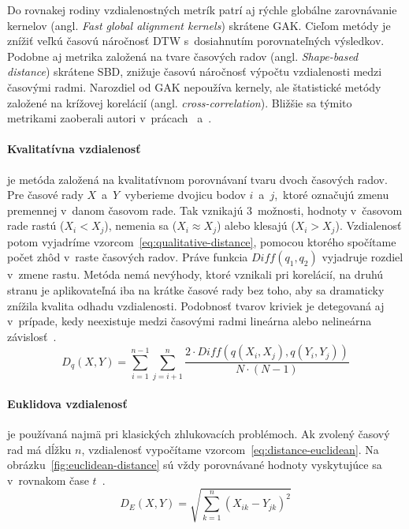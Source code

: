 \documentclass[a4paper,twoside,slovak,12pt,appendix]{article}
\begin{document}
\label{c:distance-metrics-gak}
Do rovnakej rodiny vzdialenostných metrík patrí aj rýchle globálne zarovnávanie
kernelov (angl. \textit{Fast global alignment kernels}) skrátene GAK. Cieľom
metódy je znížiť veľkú časovú náročnosť DTW s~dosiahnutím porovnateľných
výsledkov. Podobne aj metrika založená na tvare časových radov (angl.
\textit{Shape-based distance}) skrátene SBD, znižuje časovú náročnosť výpočtu
vzdialenosti medzi časovými radmi. Narozdiel od GAK nepoužíva kernely, ale
štatistické metódy založené na krížovej korelácií (angl.
\textit{cross-correlation}). Bližšie sa týmito metrikami zaoberali autori
v~prácach~\cite{Cuturi2011} a~\cite{Paparrizos2016}.

\paragraph{Kvalitatívna vzdialenosť} je metóda založená na kvalitatívnom
porovnávaní tvaru dvoch časových radov. Pre časové rady $X$~a~$Y$~vyberieme
dvojicu bodov $i$~a~$j$,~ktoré označujú zmenu premennej v~danom časovom rade.
Tak vznikajú 3~možnosti, hodnoty v~časovom rade rastú ($X_i < X_j$), nemenia sa
($X_i \approx X_j$) alebo klesajú ($X_i > X_j$). Vzdialenosť potom vyjadríme
vzorcom~\ref{eq:qualitative-distance}, pomocou ktorého spočítame počet zhôd
v~raste časových radov. Práve funkcia $Diff(q_1, q_2)$ vyjadruje rozdiel v~zmene
rastu. Metóda nemá nevýhody, ktoré vznikali pri korelácií, na druhú stranu je
aplikovateľná iba na krátke časové rady bez toho, aby sa dramaticky znížila
kvalita odhadu vzdialenosti. Podobnosť tvarov kriviek je detegovaná aj
v~prípade, kedy neexistuje medzi časovými radmi lineárna alebo nelineárna
závislosť~\cite{Dzeroski2007}.
\begin{equation}
	\label{eq:qualitative-distance}
  D_q \left( X, Y \right) = \sum_{i=1}^{n-1} \sum_{j=i+1}^{n} \frac
  {2 \cdot Diff \left( q \left( X_i, X_j \right), q \left( Y_i, Y_j \right) \right) }
  {N \cdot \left( N - 1 \right)}
\end{equation}

\paragraph{Euklidova vzdialenosť} je používaná najmä pri klasických
zhlukovacích problémoch. Ak zvolený časový rad má dĺžku $n$, vzdialenosť
vypočítame vzorcom~\ref{eq:distance-euclidean}. Na
obrázku~\ref{fig:euclidean-distance} sú vždy porovnávané hodnoty vyskytujúce sa
v~rovnakom čase $t$~\cite{WarrenLiao2005}.
\begin{equation}
	\label{eq:distance-euclidean}
  D_E \left( X, Y \right) = \sqrt{\sum_{k=1}^{n} \left( X_{ik} - Y_{jk} \right)^2 }
\end{equation}
\end{document}
